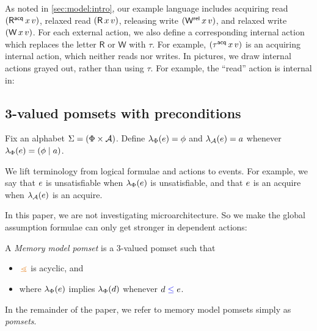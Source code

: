 As noted in \textsection\ref{sec:model:intro}, our example language includes acquiring
read $(\DRAcq{\aLoc}{\aVal})$, relaxed read $(\DR{\aLoc}{\aVal})$, releasing
write $(\DWRel{\aLoc}{\aVal})$, and relaxed write $(\DW{\aLoc}{\aVal})$.
For each external action, we also define a corresponding internal action
which replaces the letter $\mathsf{R}$ or $\mathsf{W}$ with $\tau$.
For example, $(\iDRAcq{\aLoc}{\aVal})$ is an acquiring internal action, which
neither reads nor writes. In pictures, we draw internal actions grayed out,
rather than using $\tau$.  For example, the ``read'' action is internal in:
\begin{tikzdisplay}[node distance=1em]
\end{tikzdisplay}



\subsection{3-valued pomsets with preconditions}

Fix an alphabet $\Sigma=(\Phi\times\mathcal{A})$.
Define %
$\lambda_{\Phi}(e)=\phi$ and $\lambda_{\mathcal{A}}(e)=a$ whenever
$\lambda_{\Phi}(e)=(\phi\mid a)$.

We lift terminology from logical formulae and actions to events. For example,
we say that $e$ is unsatisfiable when $\lambda_{\Phi}(e)$ is unsatisfiable,
and that $e$ is an acquire when $\lambda_{\mathcal{A}}(e)$ is an acquire.



In this paper, we are not investigating microarchitecture.  So we make the
global assumption formulae can only get stronger in dependent actions:
\begin{definition}
  \label{def:3pre}
  A \emph{Memory model pomset} is a 3-valued pomset such that
  \begin{itemize}
  \item $\gtN$ is acyclic, and
  \item where $\lambda_{\Phi}(e)$ implies $\lambda_{\Phi}(d)$ whenever
    $d\mathrel{{\color{blue}\leq}}e$.
  \end{itemize}
\end{definition}
In the remainder of the paper, we refer to memory model pomsets simply as
\emph{pomsets}.

